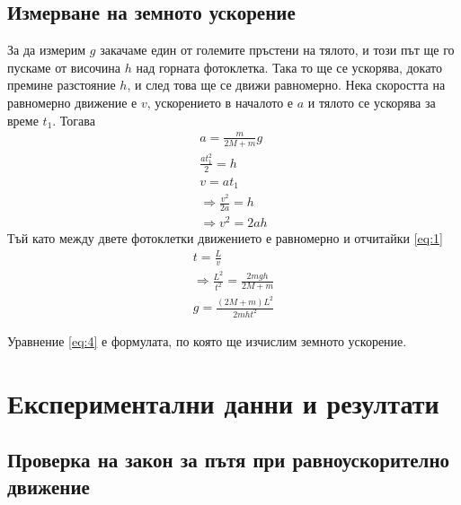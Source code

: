 \documentclass[aps, prb, twocolumn, a4paper, floatfix, reprint]{revtex4-2}
\begin{document}
\subsection{Измерване на земното ускорение}
За да измерим $g$ закачаме един от големите пръстени на тялото, и този път ще го пускаме от височина $h$ над горната фотоклетка. Така то ще се ускорява, докато премине разстояние $h$, и след това ще се движи равномерно. Нека скоростта на равномерно движение е $v$, ускорението в началото е $a$ и тялото се ускорява за време $t_1$. Тогава 
\begin{gather*}
    a = \frac{m}{2M + m} g\\
    \frac{at_1^2}{2} = h\\
    v = at_1 \\
    \Rightarrow \frac{v^2}{2a} = h\\
    \Rightarrow v^2 = 2ah\label{eq:3} \tag{3}
\end{gather*} 
Тъй като между двете фотоклетки движението е равномерно и отчитайки \eqref{eq:1} 
\begin{gather*}
    t = \frac{L}{v} \\
    \Rightarrow \frac{L^2}{t^2} = \frac{2mgh}{2M + m} \\
    g = \frac{(2M + m)L^2}{2mht^2} \label{eq:4} \tag{4}
\end{gather*}

Уравнение \eqref{eq:4} е формулата, по която ще изчислим земното ускорение.

\section{Експериментални данни и резултати}
\subsection{Проверка на закон за пътя при равноускорително движение}
\end{document}
